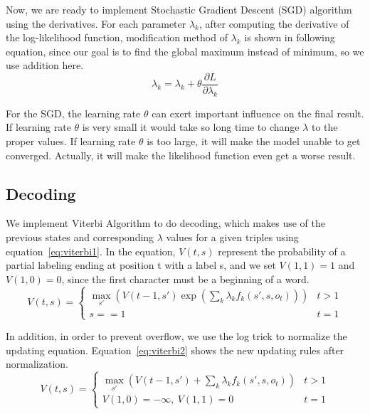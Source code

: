 \documentclass[UTF8,11pt]{article}
\begin{document}
Now, we are ready to implement Stochastic Gradient Descent (SGD) algorithm using the derivatives. For each parameter $\lambda_k$, after computing the derivative of the log-likelihood function, modification method of $\lambda_k$ is shown in following equation, since our goal is to find the global maximum instead of minimum, so we use addition here.
\begin{equation} \label{eq:sgd_update}
    \lambda_k = \lambda_k + \theta \frac{\partial L}{\partial \lambda_k}
\end{equation}

For the SGD, the learning rate $\theta$ can exert important influence on the final result. If learning rate $\theta$ is very small it would take so long time to change $\lambda$ to the proper values. If learning rate $\theta$ is too large, it will make the model unable to get converged. Actually, it will make the likelihood function even get a worse result.

\subsection{Decoding}
\noindent We implement Viterbi Algorithm to do decoding, which makes use of the previous states and corresponding $\lambda$ values for a given triples using equation~\ref{eq:viterbi1}. In the equation, $V(t, s)$ represent the probability of a partial labeling ending at position t with a label s, and we set $V(1, 1) = 1$ and $V(1, 0) = 0$, since the first character must be a beginning of a word.
\begin{equation} \label{eq:viterbi1}
V(t, s) = \left\{ \begin{array}{lc}
\max_{s'}( V(t-1, s') \exp \left( \sum_k \lambda_k f_k(s', s, o_t) \right) ) & t>1 \\
s==1 & t=1
\end{array} \right.
\end{equation}

In addition, in order to prevent overflow, we use the log trick to normalize the updating equation. Equation~\ref{eq:viterbi2} shows the new updating rules after normalization.
\begin{equation} \label{eq:viterbi2}
V(t, s) = \left\{ \begin{array}{lc}
\max_{s'}( V(t-1, s') + \sum_k \lambda_k f_k(s', s, o_t) ) & t>1 \\
V(1,0) = -\infty,\ V(1, 1) = 0 & t=1
\end{array} \right.
\end{equation}
\end{document}

